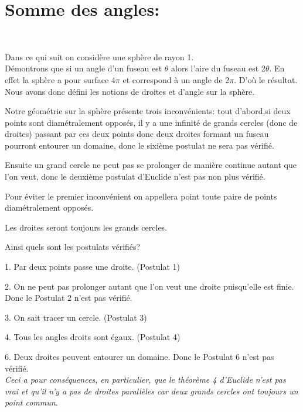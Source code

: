 \documentclass[a4paper, 12pt, twoside]{book}
\begin{document}
 \section{Somme des angles:}\
 
      
     Dans ce qui suit on considère une sphère de rayon 1.\\
        
     Démontrons que si un angle d'un fuseau est $\theta$ alors l'aire du fuseau est 2$\theta$. En effet la sphère a pour surface 4$\pi$ et correspond à un angle de 2$\pi$. D'où le résultat.\\
     
     Nous avons donc défini les notions de droites et d'angle sur la sphère.\
    
     
     Notre géométrie sur la sphère présente trois inconvénients: tout d'abord,si deux points sont diamétralement opposés, il y a une infinité de grands cercles (donc de droites) passant par ces deux points donc deux droites formant un fuseau pourront entourer un domaine, donc le sixième postulat ne sera pas vérifié.\
     
      Ensuite un grand cercle ne peut pas se prolonger de manière continue autant que l'on veut, donc le deuxième postulat d'Euclide n'est pas non plus vérifié.\
      
       Pour éviter le premier inconvénient on appellera point toute paire de points diamétralement opposés.\
       
     Les droites seront toujours les grands cercles.\
     
     Ainsi quels sont les postulats vérifiés?  \
     
     1. Par deux points  passe une droite. (Postulat 1)\
     
     2. On  ne peut pas prolonger autant que l'on veut une droite puisqu'elle est finie. Donc le Postulat 2 n'est pas vérifié.\
     
     3. On sait tracer un cercle. (Postulat 3)\
     
     4. Tous les angles droits sont égaux. (Postulat 4)\
     
     6. Deux droites peuvent entourer un domaine. Donc le Postulat 6 n'est pas vérifié.\\
     
      \textit{Ceci a pour conséquences, en particulier, que le théorème 4 d'Euclide n'est pas vrai et qu'il n'y a pas de droites parallèles car deux grands cercles ont toujours un point commun.}\\
     
\end{document}
